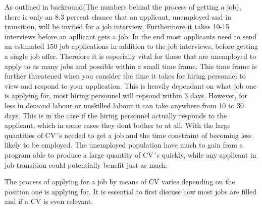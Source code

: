 As outlined in backround(The numbers behind the process of getting a job), there is only an 8.3 percent chance that an applicant, unemployed and in transition, will be invited for a job interview.
Furthermore it takes 10-15 interviews before an apllicant gets a job.
In the end most applicants need to send an estimated 150 job applications in addition to the job interviews, before getting a single job offer.
Therefore it is especially vital for those that are unemployed to apply to as many jobs and possible within a small time frame. 
This time frame is further threatened when you consider the time it takes for hiring personnel to view and respond to your application.
This is heavily dependant on what job one is applying for, most hiring personnel will repsond within 3 days. 
However, for less in demand labour or unskilled labour it can take anywhere from 10 to 30 days. 
This is in the case if the hiring personnel actually responds to the applicant, which in some cases they dont bother to at all.
With the large quantities of CV´s needed to get a job and the time constraint of becoming less likely to be employed.
The unemployed population have much to gain from a program able to produce a large quantity of CV´s quickly, while any applicant in job transition could potentially benefit just as much.

The process of applying for a job by means of CV varies depending on the position one is applying for.
It is essential to first discuss how most jobs are filled and if a CV is even relevant.

